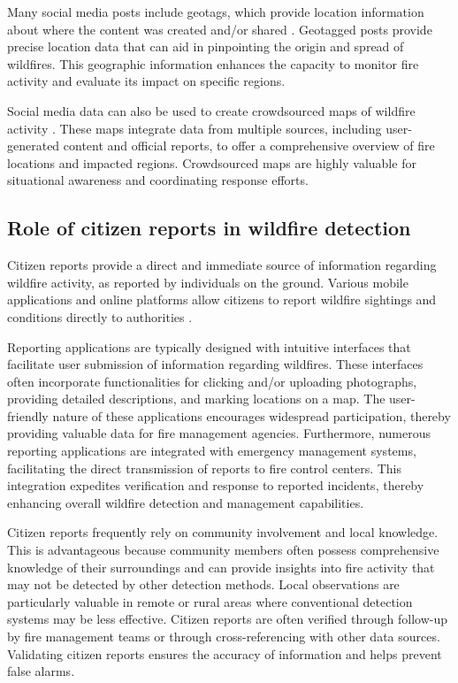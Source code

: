 \documentclass[
  12 pt,
]{Nemilov}
\begin{document}
Many social media posts include geotags, which provide location information about where the content was created and/or shared \citep{crampton2013beyond}. Geotagged posts provide precise location data that can aid in pinpointing the origin and spread of wildfires. This geographic information enhances the capacity to monitor fire activity and evaluate its impact on specific regions.

Social media data can also be used to create crowdsourced maps of wildfire activity \citep{bogdos2019crowd, zhong2016real}. These maps integrate data from multiple sources, including user-generated content and official reports, to offer a comprehensive overview of fire locations and impacted regions. Crowdsourced maps are highly valuable for situational awareness and coordinating response efforts.

\subsection{Role of citizen reports in wildfire detection}\label{role-of-citizen-reports-in-wildfire-detection}

Citizen reports provide a direct and immediate source of information regarding wildfire activity, as reported by individuals on the ground. Various mobile applications and online platforms allow citizens to report wildfire sightings and conditions directly to authorities \citep{athanasis2015aegis, monedero2019predicting, nayebi2017crowdsourced}.

Reporting applications are typically designed with intuitive interfaces that facilitate user submission of information regarding wildfires. These interfaces often incorporate functionalities for clicking and/or uploading photographs, providing detailed descriptions, and marking locations on a map. The user-friendly nature of these applications encourages widespread participation, thereby providing valuable data for fire management agencies. Furthermore, numerous reporting applications are integrated with emergency management systems, facilitating the direct transmission of reports to fire control centers. This integration expedites verification and response to reported incidents, thereby enhancing overall wildfire detection and management capabilities.

Citizen reports frequently rely on community involvement and local knowledge. This is advantageous because community members often possess comprehensive knowledge of their surroundings and can provide insights into fire activity that may not be detected by other detection methods. Local observations are particularly valuable in remote or rural areas where conventional detection systems may be less effective. Citizen reports are often verified through follow-up by fire management teams or through cross-referencing with other data sources. Validating citizen reports ensures the accuracy of information and helps prevent false alarms.
\end{document}
